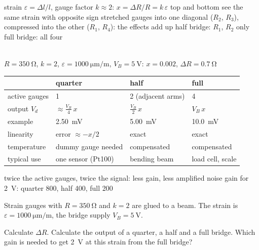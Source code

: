 \begin{description}
{\begin{center}
\end{center}
\bi
	\ite strain $\varepsilon = \Delta l/l$, gauge factor $k \approx 2$: \quad $x = \Delta R/R = k\,\varepsilon$
	\ite top and bottom see the same strain with opposite sign
	\ite stretched gauges into one diagonal ($R_2$, $R_3$), compressed into the other ($R_1$, $R_4$): the effects add up
	\ite half bridge: $R_1$, $R_2$ only \quad full bridge: all four
\ei
\newpage
\item[{\rot\bf Example: quarter, half or full bridge?}]~\\[-\lblskip]
\bi
	\ite $R = \SI{350}{\ohm}$, $k = 2$, $\varepsilon = \SI{1000}{\micro\metre/\metre}$, $V_B = \SI{5}{\volt}$: \quad $x = 0.002$, $\Delta R = \SI{0.7}{\ohm}$
\ei
\begin{center}
\begin{tabular}{llll}
\toprule
 & quarter & half & full \\
\midrule
active gauges & 1 & 2 (adjacent arms) & 4 \\
output $V_d$ & $\approx\frac{V_B}{4}\,x$ & $\frac{V_B}{2}\,x$ & $V_B\,x$ \\
example & \SI{2.50}{\milli\volt} & \SI{5.00}{\milli\volt} & \SI{10.0}{\milli\volt} \\
linearity & error $\approx -x/2$ & exact & exact \\
temperature & dummy gauge needed & compensated & compensated \\
typical use & one sensor (Pt100) & bending beam & load cell, scale \\
\bottomrule
\end{tabular}
\end{center}
\bi
	\ite twice the active gauges, twice the signal: less gain, less amplified noise
	\ite gain for \SI{2}{\volt}: quarter 800, half 400, full 200
\ei
{}
\newpage}
\end{description}

Strain gauges with $R = \SI{350}{\ohm}$ and $k = 2$ are glued to a beam. The
strain is $\varepsilon = \SI{1000}{\micro\metre/\metre}$, the bridge supply
$V_B = \SI{5}{\volt}$.
\begin{talist}
\ta Calculate $\Delta R$.
\ta Calculate the output of a quarter, a half and a full bridge.
\ta Which gain is needed to get \SI{2}{\volt} at this strain from the full bridge?
\end{talist}

